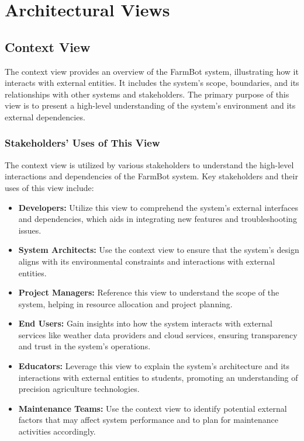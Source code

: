 \chapter{Architectural Views} \label{ArchitecturalViews}

\section{Context View}

The context view provides an overview of the FarmBot system, illustrating how it interacts with external entities. It includes the system's scope, boundaries, and its relationships with other systems and stakeholders. The primary purpose of this view is to present a high-level understanding of the system's environment and its external dependencies.
\subsection{Stakeholders’ Uses of This View}

The context view is utilized by various stakeholders to understand the high-level interactions and dependencies of the FarmBot system. Key stakeholders and their uses of this view include:

\begin{itemize}
    \item \textbf{Developers:} Utilize this view to comprehend the system's external interfaces and dependencies, which aids in integrating new features and troubleshooting issues.
    \item \textbf{System Architects:} Use the context view to ensure that the system's design aligns with its environmental constraints and interactions with external entities.
    \item \textbf{Project Managers:} Reference this view to understand the scope of the system, helping in resource allocation and project planning.
    \item \textbf{End Users:} Gain insights into how the system interacts with external services like weather data providers and cloud services, ensuring transparency and trust in the system's operations.
    \item \textbf{Educators:} Leverage this view to explain the system's architecture and its interactions with external entities to students, promoting an understanding of precision agriculture technologies.
    \item \textbf{Maintenance Teams:} Use the context view to identify potential external factors that may affect system performance and to plan for maintenance activities accordingly.
\end{itemize}

